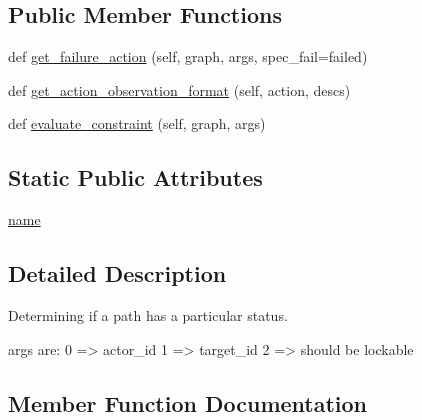 \subsection*{Public Member Functions}
\begin{DoxyCompactItemize}
\item 
def \hyperlink{classlight__chats_1_1graph_1_1LockableConstraint_a54fa507fa6b123fa5e818b48ab5bf207}{get\+\_\+failure\+\_\+action} (self, graph, args, spec\+\_\+fail=\textquotesingle{}failed\textquotesingle{})
\item 
def \hyperlink{classlight__chats_1_1graph_1_1LockableConstraint_abab472da88c21dc3ea5f7ee874bad9d4}{get\+\_\+action\+\_\+observation\+\_\+format} (self, action, descs)
\item 
def \hyperlink{classlight__chats_1_1graph_1_1LockableConstraint_ab3c3fccadea265252eb3451fae2969e4}{evaluate\+\_\+constraint} (self, graph, args)
\end{DoxyCompactItemize}
\subsection*{Static Public Attributes}
\begin{DoxyCompactItemize}
\item 
\hyperlink{classlight__chats_1_1graph_1_1LockableConstraint_a9de4ab5a0b0434496da7971c7c015054}{name}
\end{DoxyCompactItemize}


\subsection{Detailed Description}
\begin{DoxyVerb}Determining if a path has a particular status.

args are:     0 => actor_id     1 => target_id     2 => should be lockable
\end{DoxyVerb}
 

\subsection{Member Function Documentation}
\mbox{\label{classlight__chats_1_1graph_1_1LockableConstraint_ab3c3fccadea265252eb3451fae2969e4}} 
